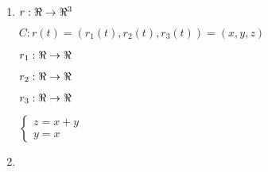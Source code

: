 \documentclass[../parcial.tex]{subfiles}
\begin{document}
    \begin{enumerate}
        \item 

            $r: \real \to \real^3 $

            $C: r(t) = (r_1(t), r_2(t), r_3(t)) = (x,y,z)$

            $r_1: \real \to \real $

            $r_2: \real \to \real $

            $r_3: \real \to \real $

            $\left\{
                \begin{array}{ll}
                    z = x+y\\
                    y = x
                \end{array}
            \right.$
            
        \item 
    \end{enumerate}
\end{document}
